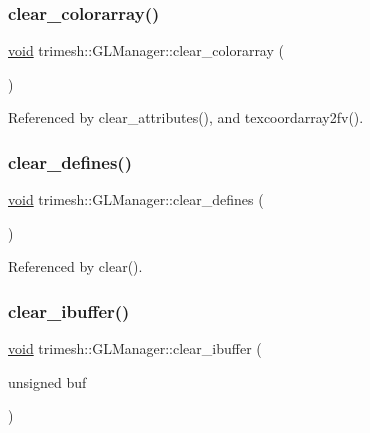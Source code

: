 \subsubsection{\texorpdfstring{clear\+\_\+colorarray()}{clear\_colorarray()}}
{\footnotesize\ttfamily \hyperlink{namespacetrimesh_a784ddfd979e1c579bda795a8edfc3f43}{void} trimesh\+::\+G\+L\+Manager\+::clear\+\_\+colorarray (\begin{DoxyParamCaption}{ }\end{DoxyParamCaption})}



Referenced by clear\+\_\+attributes(), and texcoordarray2fv().

\mbox{\label{classtrimesh_1_1GLManager_a41184a813233411724ba864c93cb1adc}} 
\subsubsection{\texorpdfstring{clear\+\_\+defines()}{clear\_defines()}}
{\footnotesize\ttfamily \hyperlink{namespacetrimesh_a784ddfd979e1c579bda795a8edfc3f43}{void} trimesh\+::\+G\+L\+Manager\+::clear\+\_\+defines (\begin{DoxyParamCaption}{ }\end{DoxyParamCaption})}



Referenced by clear().

\mbox{\label{classtrimesh_1_1GLManager_adafe4c02fd38b1c67411099f55736ee6}} 
\subsubsection{\texorpdfstring{clear\+\_\+ibuffer()}{clear\_ibuffer()}\hspace{0.1cm}{\footnotesize\ttfamily [1/3]}}
{\footnotesize\ttfamily \hyperlink{namespacetrimesh_a784ddfd979e1c579bda795a8edfc3f43}{void} trimesh\+::\+G\+L\+Manager\+::clear\+\_\+ibuffer (\begin{DoxyParamCaption}\item[{unsigned}]{buf }\end{DoxyParamCaption})}



